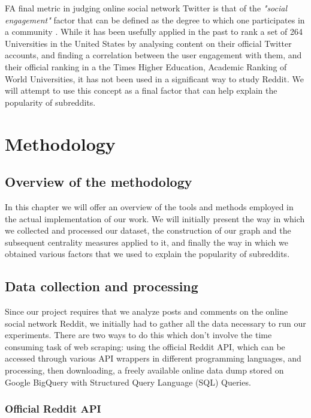 \documentclass[bsc,frontabs,twoside,singlespacing,parskip,deptreport]{infthesis}
\begin{document}
FA final metric in judging online social network Twitter is that of the \textit{"social engagement"} factor that can be defined as the degree to which one participates in a community \cite{sentiment8}. While it has been usefully applied in the past to rank a set of 264 Universities in the United States by analysing content on their official Twitter accounts, and finding a correlation between the user engagement with them, and their official ranking in a the Times Higher Education, Academic Ranking of World Universities, it has not been used in a significant way to study Reddit. We will attempt to use this concept as a final factor that can help explain the popularity of subreddits.


\chapter{Methodology}\label{methodology}

\section{Overview of the methodology}\label{method-overview}

In this chapter we will offer an overview of the tools and methods employed in the actual implementation of our work. We will initially present the way in which we collected and processed our dataset, the construction of our graph and the subsequent centrality measures applied to it, and finally the way in which we obtained various factors that we used to explain the popularity of subreddits.

\section{Data collection and processing}\label{data}

Since our project requires that we analyze posts and comments on the online social network Reddit, we initially had to gather all the data necessary to run our experiments. There are two ways to do this which don't involve the time consuming task of web scraping: using the official Reddit API, which can be accessed through various API wrappers in different programming languages, and processing, then downloading, a freely available online data dump stored on Google BigQuery with Structured Query Language (SQL) Queries.

\subsection{Official Reddit API}\label{reddit-api}
\end{document}
